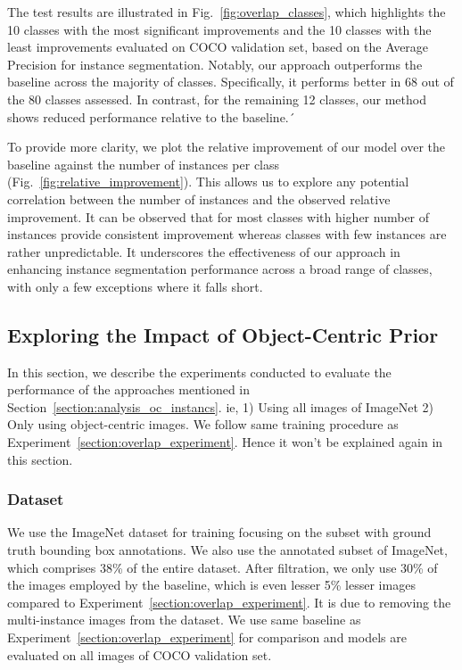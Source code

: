 The test results are illustrated in Fig.~\ref{fig:overlap_classes}, which highlights the 10 classes with the most significant improvements and the 10 classes with the least improvements evaluated on COCO validation set, based on the Average Precision for instance segmentation. Notably, our approach outperforms the baseline across the majority of classes. Specifically, it performs better in 68 out of the 80 classes assessed. In contrast, for the remaining 12 classes, our method shows reduced performance relative to the baseline.´

To provide more clarity, we plot the relative improvement of our model over the baseline against the number of instances per class (Fig.~\ref{fig:relative_improvement}). This allows us to explore any potential correlation between the number of instances and the observed relative improvement. It can be observed that for most classes with higher number of instances provide consistent improvement whereas classes with few instances are rather unpredictable. It underscores the effectiveness of our approach in enhancing instance segmentation performance across a broad range of classes, with only a few exceptions where it falls short.

\subsection{Exploring the Impact of Object-Centric Prior}
\label{section:obj_centic_prior_exp}
In this section, we describe the experiments conducted to evaluate the performance of the approaches mentioned in Section~\ref{section:analysis_oc_instancs}. ie, 1) Using all images of ImageNet 2) Only using object-centric images. We follow same training procedure as Experiment~\ref{section:overlap_experiment}. Hence it won't be explained again in this section.

\subsubsection{Dataset}
We use the ImageNet dataset for training focusing on the subset with ground truth bounding box annotations. We  also use the annotated subset of ImageNet, which comprises 38\% of the entire dataset. After filtration, we only use 30\% of the images employed by the baseline, which is even lesser 5\% lesser images compared to Experiment~\ref{section:overlap_experiment}. It is due to removing the multi-instance images from the dataset. We use same baseline as Experiment~\ref{section:overlap_experiment} for comparison and models are evaluated on all images of COCO validation set.


